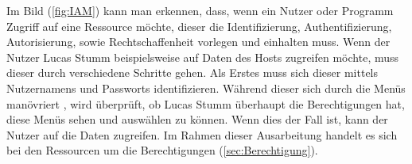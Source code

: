 \newpage
Im Bild (\ref{fig:IAM}) kann man erkennen, dass, wenn ein Nutzer oder Programm Zugriff auf eine Ressource möchte, dieser die Identifizierung, Authentifizierung, Autorisierung, sowie Rechtschaffenheit vorlegen und einhalten muss. \cite{Moha19}
Wenn der Nutzer Lucas Stumm beispielsweise auf Daten des Hosts zugreifen möchte, muss dieser durch verschiedene Schritte gehen.
Als Erstes muss sich dieser mittels Nutzernamens und Passworts identifizieren.
Während dieser sich durch die Menüs manövriert , wird überprüft, ob Lucas Stumm überhaupt die Berechtigungen hat, diese Menüs sehen und auswählen zu können.
Wenn dies der Fall ist, kann der Nutzer auf die Daten zugreifen.
\newline
Im Rahmen dieser Ausarbeitung handelt es sich bei den Ressourcen um die Berechtigungen (\ref{sec:Berechtigung}).
